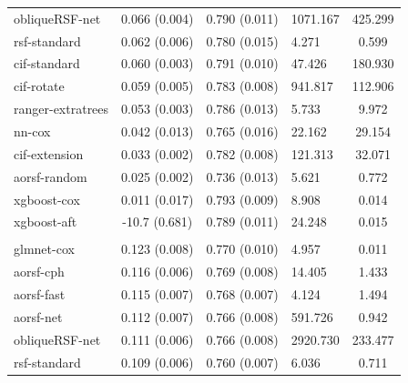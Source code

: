 \documentclass[twoside,11pt]{article}\usepackage[]{graphicx}\usepackage[]{xcolor}
\newenvironment{knitrout}{}{} %
\begin{document}
\begin{knitrout}
\begin{longtable}[t]{lcclc}
\hspace{1em}obliqueRSF-net & 0.066 (0.004) & 0.790 (0.011) & 1071.167 & 425.299\\
\hspace{1em}rsf-standard & 0.062 (0.006) & 0.780 (0.015) & 4.271 & 0.599\\
\hspace{1em}cif-standard & 0.060 (0.003) & 0.791 (0.010) & 47.426 & 180.930\\
\hspace{1em}cif-rotate & 0.059 (0.005) & 0.783 (0.008) & 941.817 & 112.906\\
\hspace{1em}ranger-extratrees & 0.053 (0.003) & 0.786 (0.013) & 5.733 & 9.972\\
\hspace{1em}nn-cox & 0.042 (0.013) & 0.765 (0.016) & 22.162 & 29.154\\
\hspace{1em}cif-extension & 0.033 (0.002) & 0.782 (0.008) & 121.313 & 32.071\\
\hspace{1em}aorsf-random & 0.025 (0.002) & 0.736 (0.013) & 5.621 & 0.772\\
\hspace{1em}xgboost-cox & 0.011 (0.017) & 0.793 (0.009) & 8.908 & 0.014\\
\hspace{1em}xgboost-aft & -10.7 (0.681) & 0.789 (0.011) & 24.248 & 0.015\\
\addlinespace[0.3em]
\hline
\multicolumn{5}{l}{\textit{\textbf{SPRINT; death, n = 9361, p = 174}}}\\
\hline
\hspace{1em}glmnet-cox & 0.123 (0.008) & 0.770 (0.010) & 4.957 & 0.011\\
\hspace{1em}aorsf-cph & 0.116 (0.006) & 0.769 (0.008) & 14.405 & 1.433\\
\hspace{1em}aorsf-fast & 0.115 (0.007) & 0.768 (0.007) & 4.124 & 1.494\\
\hspace{1em}aorsf-net & 0.112 (0.007) & 0.766 (0.008) & 591.726 & 0.942\\
\hspace{1em}obliqueRSF-net & 0.111 (0.006) & 0.766 (0.008) & 2920.730 & 233.477\\
\hspace{1em}rsf-standard & 0.109 (0.006) & 0.760 (0.007) & 6.036 & 0.711\\

\end{longtable}
\end{knitrout}
\end{document}
